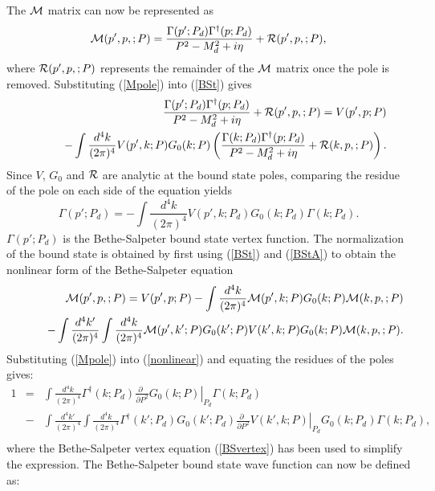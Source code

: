 \documentclass[mythesis.tex]{subfiles}
\begin{document}
The $\cal M$ matrix can now be represented as
%
\begin{equation}
{\cal M}(p',p,;P)=\frac{\Gamma(p';P_d)\Gamma^\dagger(p;P_d)}
{P^2-M_d^2+i\eta}+{\cal R}(p',p,;P), \label{Mpole}
\end{equation}
%
where ${\cal R}(p',p,;P)$ represents the remainder of the $\cal M$ matrix
once the pole is removed. Substituting (\ref{Mpole}) into (\ref{BSt}) gives
%
\begin{eqnarray}
& &\frac{\Gamma(p';P_d)\Gamma^\dagger(p;P_d)}
{P^2-M_d^2+i\eta}+{\cal R}(p',p,;P) =V(p',p;P)\nonumber \\
& & \qquad -\int\frac{d^4k}{(2\pi)^4} V(p',k;P) G_0(k;P)\left(
\frac{\Gamma(k;P_d)\Gamma^\dagger(p;P_d)}
{P^2-M_d^2+i\eta}+{\cal R}(k,p,;P)\right) .
\end{eqnarray}
%
Since $V$, $G_0$ and $\cal R$ are analytic at the bound state poles,
comparing the residue of the pole on each side of the equation yields
%
\begin{equation}
\Gamma(p';P_d)=-\int\frac{d^4k}{(2\pi)^4} V(p',k;P_d) G_0(k;P_d)
\Gamma(k;P_d).\label{BSvertex}
\end{equation}
%
$\Gamma(p';P_d)$ is the Bethe-Salpeter bound state vertex function. The
normalization of the bound state is obtained by first using (\ref{BSt})
and (\ref{BStA}) to obtain the nonlinear form of the Bethe-Salpeter
equation
%
\begin{eqnarray}
& &{\cal M}(p',p,;P)=V(p',p;P)-\int\frac{d^4k}{(2\pi)^4}{\cal M}(p',k;P)
G_0(k;P) {\cal M}(k,p,;P) \nonumber \\
& &\qquad -\int\frac{d^4k'}{(2\pi)^4}\int\frac{d^4k}{(2\pi)^4}
{\cal M}(p',k';P) G_0(k';P)V(k',k;P) G_0(k;P) {\cal M}(k,p,;P).\nonumber \\
\label{nonlinear}
\end{eqnarray}
%
Substituting (\ref{Mpole}) into (\ref{nonlinear}) and equating the residues
of the poles gives:
\begin{eqnarray}
1&=&\int\frac{d^4k}{(2\pi)^4}\Gamma^\dagger(k;P_d)
\left. \frac{\partial ~~}{\partial P^2}G_0(k;P)\right|_{P_d}\Gamma(k;P_d)
\nonumber\\
&-&\int\frac{d^4k'}{(2\pi)^4}\int\frac{d^4k}{(2\pi)^4}
\Gamma^\dagger(k';P_d)G_0(k';P_d)\left. \frac{\partial ~~}{\partial P^2}
V(k',k;P)\right|_{P_d} G_0(k;P_d)\Gamma(k;P_d),\nonumber \\
\end{eqnarray}
where the Bethe-Salpeter vertex equation (\ref{BSvertex}) has been used to
simplify the expression.
The Bethe-Salpeter bound state wave function can now be defined as:
\end{document}
